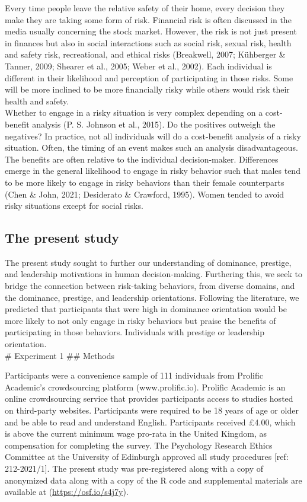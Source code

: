 \documentclass[
  donotrepeattitle,doc, 12pt, a4paper,floatsintext]{apa7}
\begin{document}
Every time people leave the relative safety of their home, every decision they make they are taking some form of risk. Financial risk is often discussed in the media usually concerning the stock market. However, the risk is not just present in finances but also in social interactions such as social risk, sexual risk, health and safety risk, recreational, and ethical risks (Breakwell, 2007; Kühberger \& Tanner, 2009; Shearer et al., 2005; Weber et al., 2002). Each individual is different in their likelihood and perception of participating in those risks. Some will be more inclined to be more financially risky while others would risk their health and safety.\\

Whether to engage in a risky situation is very complex depending on a cost-benefit analysis (P. S. Johnson et al., 2015). Do the positives outweigh the negatives? In practice, not all individuals will do a cost-benefit analysis of a risky situation. Often, the timing of an event makes such an analysis disadvantageous. The benefits are often relative to the individual decision-maker. Differences emerge in the general likelihood to engage in risky behavior such that males tend to be more likely to engage in risky behaviors than their female counterparts (Chen \& John, 2021; Desiderato \& Crawford, 1995). Women tended to avoid risky situations except for social risks.

\hypertarget{the-present-study}{%
\subsection{The present study}\label{the-present-study}}

The present study sought to further our understanding of dominance, prestige, and leadership motivations in human decision-making. Furthering this, we seek to bridge the connection between risk-taking behaviors, from diverse domains, and the dominance, prestige, and leadership orientations. Following the literature, we predicted that participants that were high in dominance orientation would be more likely to not only engage in risky behaviors but praise the benefits of participating in those behaviors. Individuals with prestige or leadership orientation.\\
\# Experiment 1
\#\# Methods

Participants were a convenience sample of 111 individuals from Prolific Academic's crowdsourcing platform (www.prolific.io). Prolific Academic is an online crowdsourcing service that provides participants access to studies hosted on third-party websites. Participants were required to be 18 years of age or older and be able to read and understand English. Participants received £4.00, which is above the current minimum wage pro-rata in the United Kingdom, as compensation for completing the survey. The Psychology Research Ethics Committee at the University of Edinburgh approved all study procedures {[}ref: 212-2021/1{]}. The present study was pre-registered along with a copy of anonymized data along with a copy of the R code and supplemental materials are available at (\url{https://osf.io/s4j7y}).
\end{document}
